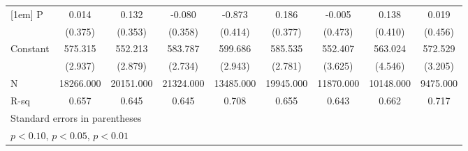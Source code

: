 \begin{table}[htbp]
\begin{tabular}{l*{8}{c}}
[1em]
P                   &       0.014         &       0.132         &      -0.080         &      -0.873\sym{**} &       0.186         &      -0.005         &       0.138         &       0.019         \\
                    &     (0.375)         &     (0.353)         &     (0.358)         &     (0.414)         &     (0.377)         &     (0.473)         &     (0.410)         &     (0.456)         \\
[1em]
Constant            &     575.315\sym{***}&     552.213\sym{***}&     583.787\sym{***}&     599.686\sym{***}&     585.535\sym{***}&     552.407\sym{***}&     563.024\sym{***}&     572.529\sym{***}\\
                    &     (2.937)         &     (2.879)         &     (2.734)         &     (2.943)         &     (2.781)         &     (3.625)         &     (4.546)         &     (3.205)         \\
\hline
N                   &   18266.000         &   20151.000         &   21324.000         &   13485.000         &   19945.000         &   11870.000         &   10148.000         &    9475.000         \\
R-sq                &       0.657         &       0.645         &       0.645         &       0.708         &       0.655         &       0.643         &       0.662         &       0.717         \\
\hline\hline
\multicolumn{9}{l}{\footnotesize Standard errors in parentheses}\\
\multicolumn{9}{l}{\footnotesize \sym{*} \(p<0.10\), \sym{**} \(p<0.05\), \sym{***} \(p<0.01\)}\\
\end{tabular}
\end{table}
